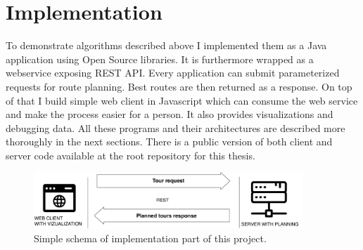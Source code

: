 \documentclass{ctuthesis}
\begin{document}
\chapter{Implementation}
To demonstrate algorithms described above I implemented them as a Java application using Open Source libraries. It is furthermore wrapped as a webservice exposing REST API. Every application can submit parameterized requests for route planning. Best routes are then returned as a response. On top of that I build simple web client in Javascript which can consume the web service and make the process easier for a person. It also provides visualizations and debugging data. All these programs and their architectures are described more thoroughly in the next sections. There is a public version of both client and server code available at the root repository for this thesis.\cite{git}
\begin{figure}[H]
	\includegraphics[width=0.9\textwidth]{communication}
	\caption{Simple schema of implementation part of this project.}
\end{figure}
\end{document}
